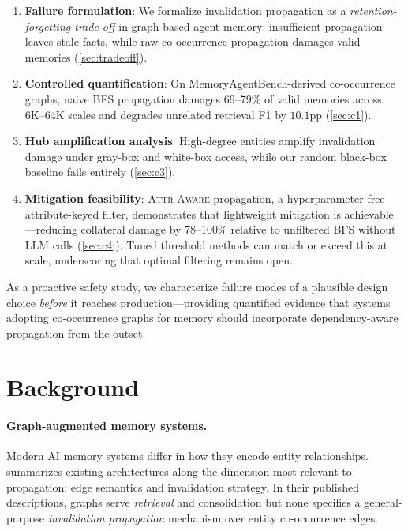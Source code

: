 \documentclass{article}
\newcommand{\attraware}{\textsc{Attr-Aware}}
\begin{document}
\begin{enumerate}
  \item \textbf{Failure formulation}: We formalize invalidation propagation as a \textit{retention-forgetting trade-off} in graph-based agent memory: insufficient propagation leaves stale facts, while raw co-occurrence propagation damages valid memories (\cref{sec:tradeoff}).

  \item \textbf{Controlled quantification}: On MemoryAgentBench-derived co-occurrence graphs, naive BFS propagation damages 69--79\% of valid memories across 6K--64K scales and degrades unrelated retrieval F1 by $10.1$pp (\cref{sec:c1}).

  \item \textbf{Hub amplification analysis}: High-degree entities amplify invalidation damage under gray-box and white-box access, while our random black-box baseline fails entirely (\cref{sec:c3}).

  \item \textbf{Mitigation feasibility}: \attraware{} propagation, a hyperparameter-free attribute-keyed filter, demonstrates that lightweight mitigation is achievable---reducing collateral damage by 78--100\% relative to unfiltered BFS without LLM calls (\cref{sec:c4}). Tuned threshold methods can match or exceed this at scale, underscoring that optimal filtering remains open.
\end{enumerate}

\noindent As a proactive safety study, we characterize failure modes of a plausible design choice \textit{before} it reaches production---providing quantified evidence that systems adopting co-occurrence graphs for memory should incorporate dependency-aware propagation from the outset.


\section{Background}
\label{sec:background}

\paragraph{Graph-augmented memory systems.}
Modern AI memory systems differ in how they encode entity relationships.
 summarizes existing architectures along the dimension most relevant to propagation: edge semantics and invalidation strategy.
In their published descriptions, graphs serve \textit{retrieval} and consolidation but none specifies a general-purpose \textit{invalidation propagation} mechanism over entity co-occurrence edges.
\end{document}
